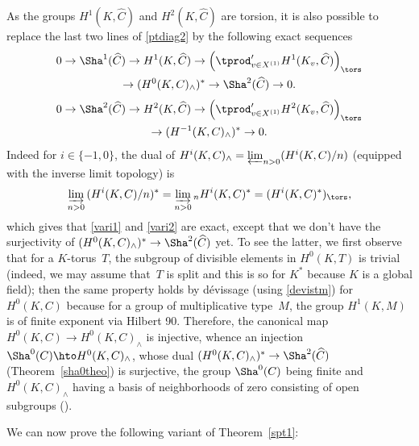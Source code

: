 \begin{rema} \label{variantors}
As the groups $H^1(K,\widehat C)$ and $H^2(K,\widehat C)$ are torsion,
it is also possible to replace the last two lines of \eqref{ptdiag2} by
the following exact sequences\vspace*{-3pt}
\begin{multline} \label{vari1}
0 \to \Sha^1(\widehat C) \to H^1(K,\widehat C) \to \Bigl(\tprod^{\prime}_{v \in X^{(1)}}H^1(K_v,\widehat C)\Bigr)_\tors\\
\to (H^0(K,C)_{\wedge}) ^* \to\Sha^2(\widehat C) \to 0.
\end{multline}
\vspace*{-20pt}
\begin{multline} \label{vari2}
0 \to \Sha^2(\widehat C) \to H^2(K,\widehat C) \to \Bigl(\tprod^{\prime}_{v \in X^{(1)}}H^2(K_v,\widehat C) \Bigl)_\tors\\
\to (H^{-1}(K,C)_{\wedge}) ^* \to 0.
\end{multline}
Indeed for $i \in \{-1,0\}$, the dual of $H^i(K,C)_{\wedge}=
\varprojlim_{n >0} (H^i(K,C)/n)$ (equipped with the inverse limit topology) is
\[
\varinjlim_{n >0} \, (H^i(K,C)/n)^*=\varinjlim_{n >0} {}_n H^i(K,C)^*=
(H^i(K,C)^*)_\tors,
\]
which gives that \eqref{vari1} and \eqref{vari2} are exact,
except that we don't have the surjectivity of
$(H^0(K,C)_{\wedge}) ^* \to \Sha^2(\widehat C)$ yet. To see the latter,
we first observe that for a $K$-torus~$T$, the subgroup of divisible
elements in $H^0(K,T)$ is trivial (indeed, we may assume that~$T$ is split
and this is so for $K^*$ because $K$ is a global field); then the same
property holds by dévissage (using \eqref{devistm}) for $H^0(K,C)$ because
for a group of multiplicative type~$M$, the group $H^1(K,M)$ is of finite
exponent via Hilbert 90. Therefore, the canonical map $H^0(K,C) \to
H^0(K,C)_{\wedge}$ is injective, whence
an injection $\Sha^0(C) \hto\nobreak H^0(K,C)_{\wedge}$, whose dual
$(H^0(K,C)_{\wedge})^* \to \Sha^2(\widehat C)$ (\cf Theorem~\ref{sha0theo})
is surjective, the group $\Sha^0(C)$ being finite and $H^0(K,C)_{\wedge}$
having a basis of neighborhoods of zero
consisting of open subgroups (\cf \cite[Lem.\,2.4]{hss}).
\end{rema}

We can now prove the following variant of Theorem~\ref{spt1}:

